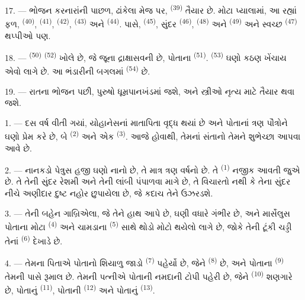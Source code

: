 \VUsaut{2.4mm}
\VUsaut{3.0mm}

17. --- ભોજન કરનારાંની પાછળ,  ઢાંકેલા મેજ પર,
 \textsuperscript{(39)} તૈયાર છે. મોટા પ્યાલામાં, આ રહ્યાં
ફળ,  \textsuperscript{(40)}, 
\textsuperscript{(41)},  \textsuperscript{(42)},
 \textsuperscript{(43)} અને 
\textsuperscript{(44)}. પાસે,  \textsuperscript{(45)},
સુંદર  \textsuperscript{(46)}, 
\textsuperscript{(48)} અને  \textsuperscript{(49)} અને
સ્વચ્છ  \textsuperscript{(47)} થપ્પીઓ પણ.

18. ---  \textsuperscript{(50)} 
\textsuperscript{(52)} ખોલે છે, જે જૂના દ્રાક્ષાસવની છે, પોતાના
 \textsuperscript{(51)}. 
\textsuperscript{(53)} ઘણો કઠણ ખેંચાય એવો લાગે છે. આ ભંડારીની બગલમાં
 \textsuperscript{(54)} છે.

19. --- રાતના ભોજન પછી, પુરુષો ધૂમ્રપાનખંડમાં જશે, અને સ્ત્રીઓ
નૃત્ય માટે તૈયાર થવા જશે.

\VUsaut{5.0mm}
\VUsaut{1.6mm}
\VUsaut{2.6mm}

\VUsaut{3.0mm}

1. --- દસ વર્ષ વીતી ગયાં, યોહાનેસનાં માતાપિતા વૃદ્ધ થયાં છે અને
પોતાનાં ત્રણ પૌત્રોને ઘણો પ્રેમ કરે છે, બે 
\textsuperscript{(2)} અને એક  \textsuperscript{(3)}. આજે
 હોવાથી, તેમનાં સંતાનો તેમને શુભેચ્છા આપવા
આવે છે.

2. --- નાનકડો પેત્રુસ હજી ઘણો નાનો છે, તે માત્ર ત્રણ વર્ષનો છે. તે
 \textsuperscript{(1)} નજીક આવતી જુએ છે. તે તેની સુંદર
રેશમી  અને તેની લાંબી  પંપાળવા માગે છે,
તે વિચારતો નથી કે તેના સુંદર  નીચે અણીદાર દુષ્ટ નહોર
છુપાયેલા છે, જે કદાચ તેને ઉઝરડશે.

3. --- તેની બહેન ગાબ્રિએલા, જે તેને હાથ આપે છે, ઘણી વધારે ગંભીર છે,
અને માર્સેલુસ પોતાના મોટા  \textsuperscript{(4)} અને
ચામડાના  \textsuperscript{(5)} સાથે થોડો મોટો થયેલો લાગે
છે, જોકે તેની ટૂંકી ચડ્ડી તેનાં  \textsuperscript{(6)}
દેખાડે છે.

4. --- તેમના પિતાએ પોતાનો શિયાળુ જાડો 
\textsuperscript{(7)} પહેર્યો છે, જેને 
\textsuperscript{(8)} છે, અને પોતાના 
\textsuperscript{(9)} તેમની પાસે રૂમાલ છે. તેમની પત્નીએ પોતાની નમદાની
ટોપી પહેરી છે, જેને  \textsuperscript{(10)} શણગારે છે,
પોતાનું  \textsuperscript{(11)}, પોતાની  \textsuperscript{(12)} અને પોતાનું 
\textsuperscript{(13)}.

